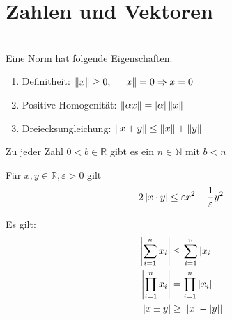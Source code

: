 \section{Zahlen und Vektoren}
	\begin{multicols}{2}
			\begin{definition}\hfill\\
				Eine Norm hat folgende Eigenschaften:
				\begin{enumerate}
					\item Definitheit: $\left\Vert x \right\Vert \geq 0, \quad \left\Vert x \right\Vert = 0 \Rightarrow x = 0$
					\item Positive Homogenität: $\left\Vert \alpha x \right\Vert = \left\vert \alpha \right\vert \left\Vert x \right\Vert$
					\item Dreiecksungleichung: $\left\Vert x + y \right\Vert \leq \left\Vert x \right\Vert + \left\Vert y \right\Vert$
				\end{enumerate}
			\end{definition}
			\begin{theorem}
				Zu jeder Zahl $0 < b \in \mathbb{R}$ gibt es ein $n \in \mathbb{N}$ mit $b < n$
			\end{theorem}
			\begin{theorem}
				Für $x,y \in \mathbb{R}, \varepsilon > 0$ gilt
				\begin{equation*}
					2 \left\vert x \cdot y \right\vert \leq \varepsilon x^2 + \frac{1}{\varepsilon} y^2
				\end{equation*}
			\end{theorem}
			\begin{theorem}[Dreiecksungleichungen]
				Es gilt: 
				\begin{align*}
					\left\vert \sum\limits_{i=1}^{n} x_i \right\vert &\leq \sum\limits_{i=1}^{n} \left\vert x_i \right\vert \\
					\left\vert \prod\limits_{i=1}^{n} x_i \right\vert &= \prod\limits_{i=1}^{n} \left\vert x_i \right\vert \\
					\left\vert x \pm y \right\vert &\geq \left\vert \left\vert x \right\vert - \left\vert y \right\vert \right\vert 
				\end{align*}
			\end{theorem}

\end{multicols}
